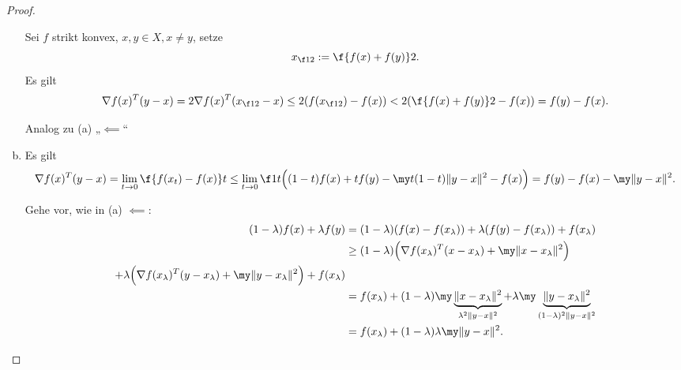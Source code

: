 \begin{st}
\begin{proof}
\begin{enumerate}[(a)]
\begin{seg}[„$\implies$“]
					Sei $f$ strikt konvex, $x, y \in X, x\neq y$, setze
					\[
						x_{\f 12} := \f {f(x) + f(y)}2.
					\]
					Es gilt
					\[
						\nabla f(x)^T (y-x)
						= 2 \nabla f(x)^T (x_{\f 12} - x)
						\le 2 (f(x_{\f 12}) - f(x))
						< 2 (\f {f(x) + f(y)}2 - f(x))
						= f(y) - f(x).
					\]
				\end{seg}
				\begin{seg}[„$\impliedby$“]
					Analog zu (a) „$\impliedby$“
				\end{seg}
			\item
				\begin{seg}[„$\implies$“]
					Es gilt
					\[
						\nabla f(x)^T (y-x)
						= \lim_{t\to 0} \f {f(x_t) - f(x)}t
						\le \lim_{t\to 0} \f 1t \Big( (1-t)f(x) + tf(y) - \my t(1-t)\|y-x\|^2 - f(x) \Big)
						= f(y) - f(x) - \my \|y-x\|^2.
					\]
				\end{seg}
				\begin{seg}[„$\impliedby$“]
					Gehe vor, wie in (a) $\impliedby$:
					\begin{align*}
						(1-\lambda) f(x) + \lambda f(y)
						&= (1-\lambda) (f(x) - f(x_\lambda)) + \lambda (f(y) - f(x_\lambda)) + f(x_\lambda) \\
						&\ge (1-\lambda) \Big(\nabla f(x_\lambda)^T (x-x_\lambda) + \my \|x-x_\lambda\|^2 \Big) \\
							+ \lambda \Big( \nabla f(x_\lambda)^T (y-x_\lambda) + \my \|y-x_\lambda\|^2 \Big) + f(x_\lambda) \\
						&= f(x_\lambda) + (1-\lambda)\my \underbrace{\|x - x_\lambda\|^2}_{\lambda^2 \|y-x\|^2} + \lambda \my \underbrace{\|y-x_\lambda\|^2}_{(1-\lambda)^2\|y-x\|^2} \\
						&=  f(x_\lambda) + (1-\lambda)\lambda \my \|y-x\|^2.
					\end{align*}
				\end{seg}
		\end{enumerate}
	\end{proof}
\end{st}

